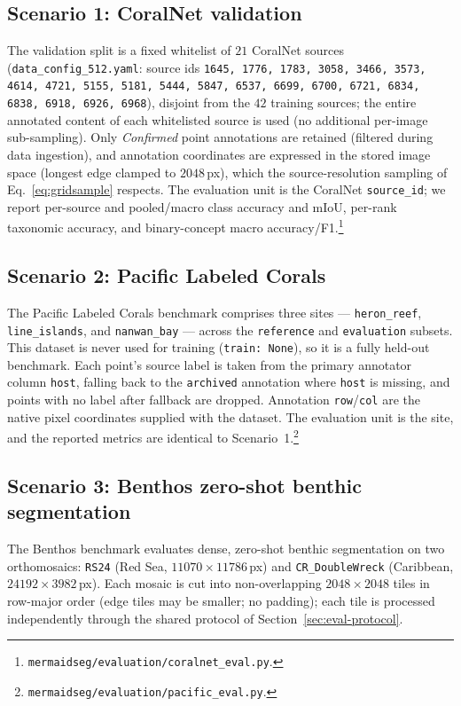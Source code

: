 \subsection{Scenario 1: CoralNet validation}
\label{sec:eval-coralnet}

The validation split is a fixed whitelist of $21$ CoralNet sources
(\texttt{data\_config\_512.yaml}: source ids
\texttt{1645, 1776, 1783, 3058, 3466, 3573, 4614, 4721, 5155, 5181, 5444, 5847,
6537, 6699, 6700, 6721, 6834, 6838, 6918, 6926, 6968}), disjoint from the $42$
training sources; the entire annotated content of each whitelisted source is
used (no additional per-image sub-sampling). Only \emph{Confirmed} point
annotations are retained (filtered during data ingestion), and annotation
coordinates are expressed in the stored image space (longest edge clamped to
$2048$\,px), which the source-resolution sampling of
Eq.~\eqref{eq:gridsample} respects. The evaluation unit is the CoralNet
\texttt{source\_id}; we report per-source and pooled/macro class accuracy and
mIoU, per-rank taxonomic accuracy, and binary-concept macro accuracy/F1.\footnote{%
\texttt{mermaidseg/evaluation/coralnet\_eval.py}.}

\subsection{Scenario 2: Pacific Labeled Corals}
\label{sec:eval-pacific}

The Pacific Labeled Corals benchmark comprises three sites --- \texttt{heron\_reef},
\texttt{line\_islands}, and \texttt{nanwan\_bay} --- across the \texttt{reference} and
\texttt{evaluation} subsets. This dataset is never used for training
(\texttt{train: None}), so it is a fully held-out benchmark. Each point's source
label is taken from the primary annotator column \texttt{host}, falling back to
the \texttt{archived} annotation where \texttt{host} is missing, and points with
no label after fallback are dropped. Annotation \texttt{row}/\texttt{col} are the
native pixel coordinates supplied with the dataset. The evaluation unit is the
site, and the reported metrics are identical to
Scenario~1.\footnote{\texttt{mermaidseg/evaluation/pacific\_eval.py}.}

\subsection{Scenario 3: Benthos zero-shot benthic segmentation}
\label{sec:eval-benthos}

The Benthos benchmark evaluates dense, zero-shot benthic segmentation on two
orthomosaics: \texttt{RS24} (Red Sea, $11070\times11786$\,px) and
\texttt{CR\_DoubleWreck} (Caribbean, $24192\times3982$\,px). Each mosaic is cut
into non-overlapping $2048\times2048$ tiles in row-major order (edge tiles may be
smaller; no padding); each tile is processed independently through the shared
protocol of Section~\ref{sec:eval-protocol}.

